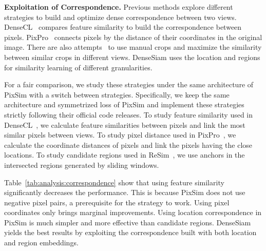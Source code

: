\documentclass[runningheads]{llncs}
\newcommand{\myparagraph}[1]{{\noindent\bf #1}}
\begin{document}
\myparagraph{Exploitation of Correspondence.}
Previous methods explore different strategies to build and optimize dense correspondence between two views.
DenseCL~\cite{densecl} compares feature similarity to build the correspondence between pixels.
PixPro~\cite{pixpro} connects pixels by the distance of their coordinates in the original image.
There are also attempts~\cite{resim, scrl} to use manual crops and maximize the similarity between similar crops in different views.
DenseSiam uses the location and regions for similarity learning of different granularities.

For a fair comparison, we study these strategies under the same architecture of PixSim with a switch between strategies.
Specifically, we keep the same architecture and symmetrized loss of PixSim and implement these strategies strictly following their official code releases.
To study feature similarity used in DenseCL~\cite{densecl}, we calculate feature similarities between pixels and link the most similar pixels between views.
To study pixel distance used in PixPro~\cite{pixpro},  we calculate the coordinate distances of pixels and link the pixels having the close locations.
To study candidate regions used in ReSim~\cite{resim}, we use anchors in the intersected regions generated by sliding windows.

Table~\ref{tab:analysis:correspondence} show that using feature similarity~\cite{densecl} significantly decreases the performance.
This is because PixSim does not use negative pixel pairs, a prerequisite for the strategy to work.
Using pixel coordinates only brings marginal improvements.
Using location correspondence in PixSim is much simpler and more effective than candidate regions.
DenseSiam yields the best results by exploiting the correspondence built with both location and region embeddings.
\end{document}
